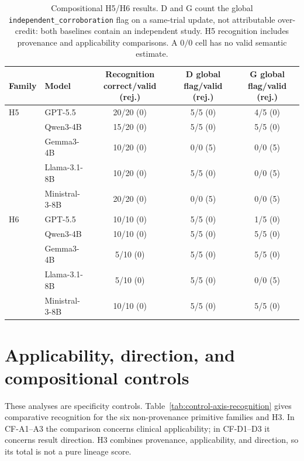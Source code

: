 \documentclass[11pt]{article}
\begin{document}
\begin{table}[t]
\centering
\small
\begin{tabular}{@{}llccc@{}}
\toprule
Family & Model & Recognition correct/valid (rej.) & D global flag/valid (rej.) & G global flag/valid (rej.) \\
\midrule
H5 & GPT-5.5 & 20/20 (0) & 5/5 (0) & 4/5 (0) \\
   & Qwen3-4B & 15/20 (0) & 5/5 (0) & 5/5 (0) \\
   & Gemma3-4B & 10/20 (0) & 0/0 (5) & 0/0 (5) \\
   & Llama-3.1-8B & 10/20 (0) & 5/5 (0) & 0/0 (5) \\
   & Ministral-3-8B & 20/20 (0) & 0/0 (5) & 0/0 (5) \\
\addlinespace[2pt]
H6 & GPT-5.5 & 10/10 (0) & 5/5 (0) & 1/5 (0) \\
   & Qwen3-4B & 10/10 (0) & 5/5 (0) & 5/5 (0) \\
   & Gemma3-4B & 5/10 (0) & 5/5 (0) & 5/5 (0) \\
   & Llama-3.1-8B & 5/10 (0) & 5/5 (0) & 0/0 (5) \\
   & Ministral-3-8B & 10/10 (0) & 5/5 (0) & 5/5 (0) \\
\bottomrule
\end{tabular}
\caption{Compositional H5/H6 results. D and G count the global \texttt{independent\_corroboration} flag on a same-trial update, not attributable over-credit: both baselines contain an independent study. H5 recognition includes provenance and applicability comparisons. A $0/0$ cell has no valid semantic estimate.}
\label{tab:compositional-detail}
\end{table}

\section{Applicability, direction, and compositional controls}
\label{app:control-axis-results}

These analyses are specificity controls. Table~\ref{tab:control-axis-recognition} gives comparative recognition for the six non-provenance primitive families and H3. In CF-A1--A3 the comparison concerns clinical applicability; in CF-D1--D3 it concerns result direction. H3 combines provenance, applicability, and direction, so its total is not a pure lineage score.
\end{document}
